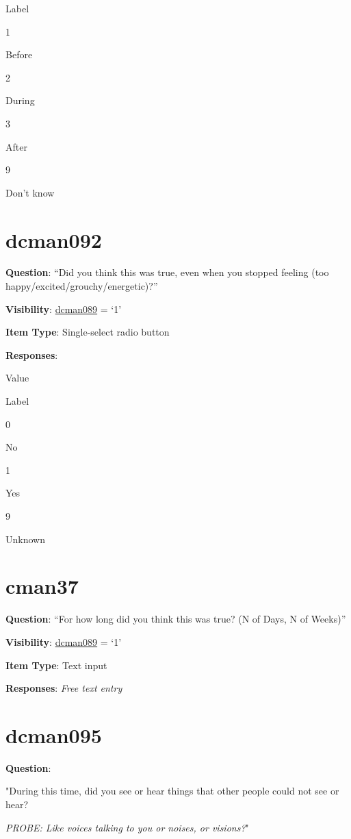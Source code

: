 \documentclass[]{book}
\begin{document}
Label

1

Before

2

During

3

After

9

Don't know

\hypertarget{dcman092}{%
\section{dcman092}\label{dcman092}}

\textbf{Question}: ``Did you think this was true, even when you stopped feeling (too happy/excited/grouchy/energetic)?''

\textbf{Visibility}: \protect\hyperlink{dcman089}{dcman089} = `1'

\textbf{Item Type}: Single-select radio button

\textbf{Responses}:

Value

Label

0

No

1

Yes

9

Unknown

\hypertarget{cman37}{%
\section{cman37}\label{cman37}}

\textbf{Question}: ``For how long did you think this was true? (N of Days, N of Weeks)''

\textbf{Visibility}: \protect\hyperlink{dcman089}{dcman089} = `1'

\textbf{Item Type}: Text input

\textbf{Responses}: \emph{Free text entry}

\hypertarget{dcman095}{%
\section{dcman095}\label{dcman095}}

\textbf{Question}:

"During this time, did you see or hear things that other people could not see or hear?

\emph{PROBE: Like voices talking to you or noises, or visions?}"
\end{document}
